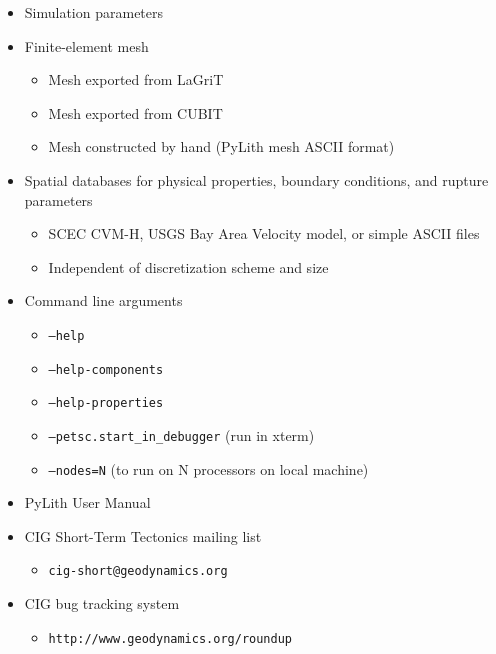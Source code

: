 \documentclass[pdftex,cig,slideColor]{pp4slides}
\begin{document}
  \begin{itemize}
  \item Simulation parameters
  \item Finite-element mesh
    \begin{itemize}
    \item Mesh exported from LaGriT
    \item Mesh exported from CUBIT
    \item Mesh constructed by hand (PyLith mesh ASCII format)
    \end{itemize}
  \item Spatial databases for physical properties, boundary
    conditions, and rupture parameters
    \begin{itemize}
    \item SCEC CVM-H, USGS Bay Area Velocity model, or simple ASCII files
    \item Independent of discretization scheme and size
    \end{itemize}
  \end{itemize}

  \summary{}

  \begin{itemize}
  \item Command line arguments
    \begin{itemize}
    \item {\tt --help}
    \item {\tt --help-components}
    \item {\tt --help-properties}
    \item {\tt --petsc.start\_in\_debugger} (run in xterm)
    \item {\tt --nodes=N} (to run on N processors on local machine)
    \end{itemize}
  \item PyLith User Manual
  \item CIG Short-Term Tectonics mailing list
    \begin{itemize}
    \item {\tt cig-short@geodynamics.org}
    \end{itemize}
  \item CIG bug tracking system
    \begin{itemize}
    \item {\tt http://www.geodynamics.org/roundup}
    \end{itemize}
  \end{itemize}
\end{document}
